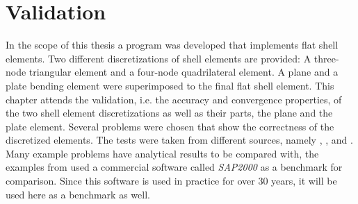 \section{Validation}
In the scope of this thesis a program was developed that implements flat shell elements. Two different discretizations of shell elements are provided: A three-node triangular element and a four-node quadrilateral element. A plane and a plate bending element were superimposed to the final flat shell element. This chapter attends the validation, i.e. the accuracy and convergence properties, of the two shell element discretizations as well as their parts, the plane and the plate element. Several problems were chosen that show the correctness of the discretized elements. The tests were taken from different sources, namely \cite{kansara2004development}, \cite{macneal1985proposed}, \cite{wilson1996three} and \cite{jin1994analysis}. Many example problems have analytical results to be compared with, the examples from \cite{kansara2004development} used a commercial software called \textit{SAP2000} \cite{sap-2000} as a benchmark for comparison. Since this software is used in practice for over 30 years, it will be used here as a benchmark as well.

